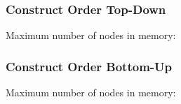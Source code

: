 \documentclass{beamer}
\begin{document}

\begin{frame}
	\frametitle{Construct Order Top-Down}
	\centering
	Maximum number of nodes in memory:
		 \\[1cm]
	
\end{frame}

\begin{frame}
	\frametitle{Construct Order Bottom-Up}
	\centering
	Maximum number of nodes in memory:
		 \\[1cm]
	
\end{frame}
\end{document}

